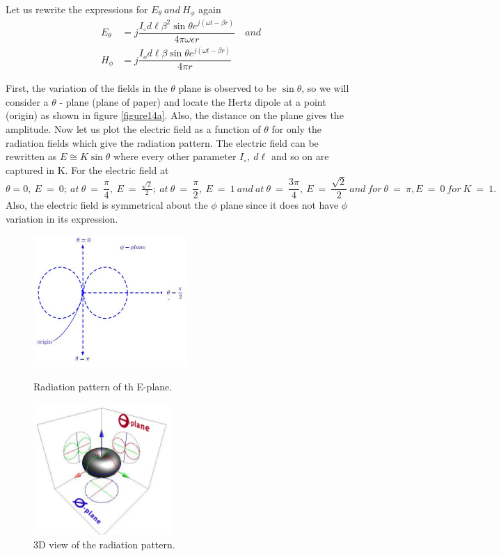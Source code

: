 \paragraph{}
Let us rewrite the expressions for $E_\theta \ and \ H_\phi$ again
\begin{align*}
E_\theta &= j\dfrac{I_\circ d\ell\beta^2\sin\theta e^{j(\omega t - \beta r)}}{4\pi\omega\epsilon r} \quad and 
\\
H_\phi &= j\dfrac{I_od\ell\beta\sin\theta e^{j(\omega t - \beta r)}}{4\pi r}
\end{align*}

First, the variation of the fields in the $\theta$ plane is observed to be $\sin\theta$, so we will consider a $\theta$ - plane (plane of paper) and locate the Hertz dipole at a point (origin) as shown in figure \ref{figure14a}. Also, the distance on the plane gives the amplitude. Now let us plot the electric field as a function of $\theta$ for only the radiation fields which give the radiation pattern. The electric field can be rewritten as $E \cong K\sin\theta$ where every other parameter $I_\circ, \ d\ell$ and so on are captured in K. For the electric field at $\theta = 0,\ E\ =\ 0;\ at\ \theta\ =\ \dfrac{\pi}{4},\ E\ =\ \frac{\sqrt{2}}{2};\ at\ \theta\ =\ \dfrac{\pi}{2},\ E\ =\ 1\ and\ at\ \theta\ =\ \dfrac{3\pi}{4},\ E\ =\ \dfrac{\sqrt{2}}{2}\ and\ for\ \theta\ =\ \pi, E\ =\ 0\ for\ K\ =\ 1. $
Also, the electric field is symmetrical about the $\phi$ plane since it does not have $\phi$ variation in its expression. 
\begin{figure}[!tbp]
\centering
\begin{minipage}[b]{0.4\textwidth}
\includegraphics[height=5cm]{./graphics/diagram3a.jpg}
\caption{Radiation pattern of th E-plane.}
\label{figure14a}
\end{minipage}
\hfill
\begin{minipage}[b]{0.4\textwidth}
\includegraphics[height=5cm]{"./graphics/3D view radiation pattern"}
\caption{3D view of the radiation pattern.}
\label{figure14b}
\end{minipage}
\end{figure}

